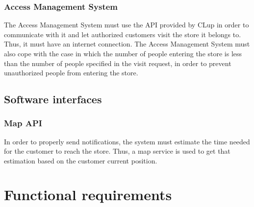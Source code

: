 \documentclass[a4paper,oneside,11pt]{book}   %
\begin{document}
    \subsubsection{Access Management System}
    The Access Management System must use the API provided by CLup in order to communicate with it and let authorized customers visit the store it belongs to. Thus, it must have an internet connection. The Access Management System must also cope with the case in which the number of people entering the store is less than the number of people specified in the visit request, in order to prevent unauthorized people from entering the store.
    
    \subsection{Software interfaces}
    \subsubsection{Map API}
    In order to properly send notifications, the system must estimate the time needed for the customer to reach the store. Thus, a map service is used to get that estimation based on the customer current position.
    
    \section{Functional requirements}
\end{document}
